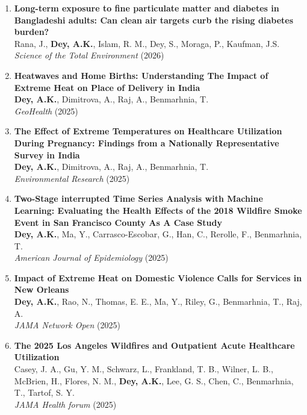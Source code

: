 \documentclass[13pt,letterpaper]{article}
\begin{document}
\begin{enumerate}
\item \textbf{Long-term exposure to fine particulate matter and diabetes in Bangladeshi adults: Can clean air targets curb the rising diabetes burden?}\\
Rana, J., \textbf{Dey, A.K.}, Islam, R. M., Dey, S., Moraga, P., Kaufman, J.S. \\
\emph{Science of the Total Environment} (2026) 

\item \textbf{Heatwaves and Home Births: Understanding The Impact of Extreme Heat on Place of Delivery in India}\\
\textbf{Dey, A.K.}, Dimitrova, A., Raj, A., Benmarhnia, T.\\
\emph{GeoHealth} (2025) 

\item \textbf{The Effect of Extreme Temperatures on Healthcare Utilization During Pregnancy: Findings from a Nationally Representative Survey in India}\\
\textbf{Dey, A.K.}, Dimitrova, A., Raj, A., Benmarhnia, T.\\
\emph{Environmental Research} (2025) 

\item \textbf{Two-Stage interrupted Time Series Analysis with Machine Learning: Evaluating the Health Effects of the 2018 Wildfire Smoke Event in San Francisco County As A Case Study}\\
\textbf{Dey, A.K.}, Ma, Y., Carrasco-Escobar, G., Han, C., Rerolle, F., Benmarhnia, T.\\
\emph{American Journal of Epidemiology} (2025) 

\item \textbf{Impact of Extreme Heat on Domestic Violence Calls for Services in New Orleans}\\
\textbf{Dey, A.K.}, Rao, N., Thomas, E. E., Ma, Y., Riley, G., Benmarhnia, T., Raj, A.\\
\emph{JAMA Network Open} (2025) 

\item \textbf{The 2025 Los Angeles Wildfires and Outpatient Acute Healthcare Utilization}\\
Casey, J. A., Gu, Y. M., Schwarz, L., Frankland, T. B., Wilner, L. B., McBrien, H., Flores, N. M., \textbf{Dey, A.K.}, Lee, G. S., Chen, C., Benmarhnia, T., Tartof, S. Y.\\
\emph{JAMA Health forum}  (2025) 


\end{enumerate}
\end{document}
